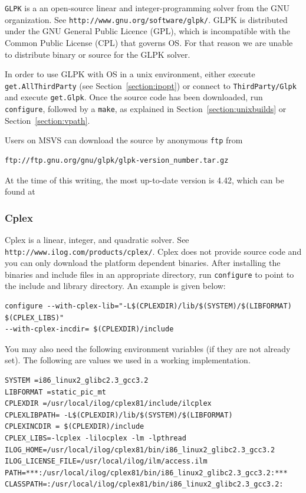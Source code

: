 \documentclass[11pt]{article}
\renewcommand{\_}{{\char"5F}}
\renewcommand{\{}{{\char"7B}}
\renewcommand{\}}{{\char"7D}}
\renewcommand{\^}{{\char"0D}}
\renewcommand{\'}{{\char"0D}}
\newcommand{\UrlCplex}{http://www.ilog.com/products/cplex/}
\newcommand{\UrlGlpk}{http://www.gnu.org/software/glpk/}
\newcommand{\UrlGlpkDownload}{ftp://ftp.gnu.org/gnu/glpk/glpk-4.42.tar.gz}
\newcommand{\GlpkVer}{4.42}
\begin{document}
%
{\tt GLPK} is a an open-source linear and integer-programming solver from the GNU organization.
See {\tt\UrlGlpk}. GLPK is distributed under the GNU General Public Licence (GPL), which is incompatible 
with the Common Public License (CPL) that governs OS. For that reason we are unable to distribute binary
or source for the GLPK solver.

In order to use GLPK with OS in a unix environment, either execute {\tt get.AllThirdParty}
(see Section~\ref{section:ipopt})
or connect to {\tt ThirdParty/Glpk} and execute {\tt get.Glpk}. Once the source code has been downloaded,
run {\tt configure}, followed by a {\tt make}, as explained in Section~\ref{section:unixbuilds} or 
Section~\ref{section:vpath}.

Users on MSVS can download the source by
anonymous {\tt ftp} from
\begin{verbatim}
ftp://ftp.gnu.org/gnu/glpk/glpk-version_number.tar.gz
\end{verbatim}

At the time of this writing, the most up-to-date version is \GlpkVer, which can be found at

\noindent{\tt\UrlGlpkDownload}

\subsubsection{Cplex}

%
Cplex is a linear, integer, and quadratic solver. See {\tt\UrlCplex}.
Cplex does not provide source code and you can only download the platform dependent binaries.
After installing the binaries and include files in an appropriate directory, run {\tt configure} to point to the
include and library directory. An example is given below:

\begin{verbatim}
configure --with-cplex-lib="-L$(CPLEXDIR)/lib/$(SYSTEM)/$(LIBFORMAT) $(CPLEX_LIBS)"
--with-cplex-incdir= $(CPLEXDIR)/include
\end{verbatim}

You may also need the following environment variables (if they are not already set). The following are values we used in a working implementation.
\begin{verbatim}
SYSTEM =i86_linux2_glibc2.3_gcc3.2
LIBFORMAT =static_pic_mt
CPLEXDIR =/usr/local/ilog/cplex81/include/ilcplex
CPLEXLIBPATH= -L$(CPLEXDIR)/lib/$(SYSTEM)/$(LIBFORMAT)
CPLEXINCDIR = $(CPLEXDIR)/include
CPLEX_LIBS=-lcplex -lilocplex -lm -lpthread
ILOG_HOME=/usr/local/ilog/cplex81/bin/i86_linux2_glibc2.3_gcc3.2
ILOG_LICENSE_FILE=/usr/local/ilog/ilm/access.ilm
PATH=***:/usr/local/ilog/cplex81/bin/i86_linux2_glibc2.3_gcc3.2:***
CLASSPATH=:/usr/local/ilog/cplex81/bin/i86_linux2_glibc2.3_gcc3.2:
\end{verbatim}
\end{document}
